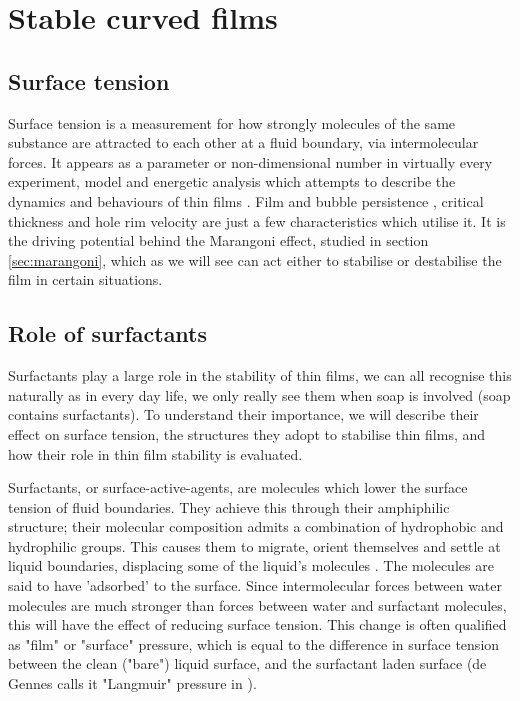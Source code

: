 \documentclass[a4paper,12pt]{article}
\numberwithin{equation}{section}
\numberwithin{figure}{section}
\numberwithin{table}{section}
\begin{document}
\newpage
\section{Stable curved films}
\subsection{Surface tension}
Surface tension is a measurement for how strongly molecules of the same substance are attracted to each other at a fluid boundary, via intermolecular forces. It appears as a parameter or non-dimensional number in virtually every experiment, model and energetic analysis which attempts to describe the dynamics and behaviours of thin films \cite{Ida1998}. Film and bubble persistence \cite{Modini2013}, critical thickness \cite{Manev1974, Lhuissier2011} and hole rim velocity \cite{Culick1960} are just a few characteristics which utilise it. It is the driving potential behind the Marangoni effect, studied in section \ref{sec:marangoni}, which as we will see can act either to stabilise or destabilise the film in certain situations.


\subsection{Role of surfactants}
Surfactants play a large role in the stability of thin films, we can all recognise this naturally as in every day life, we only really see them when soap is involved (soap contains surfactants). To understand their importance, we will describe their effect on surface tension, the structures they adopt to stabilise thin films, and how their role in thin film stability is evaluated.

Surfactants, or surface-active-agents, are molecules which lower the surface tension of fluid boundaries. They achieve this through their amphiphilic structure; their molecular composition admits a combination of hydrophobic and hydrophilic groups. This causes them to migrate, orient themselves and settle at liquid boundaries, displacing some of the liquid's molecules \cite{Gast1997}. The molecules are said to have 'adsorbed' to the surface. Since intermolecular forces between water molecules are much stronger than forces between water and surfactant molecules, this will have the effect of reducing surface tension. This change is often qualified as "film" or "surface" pressure, which is equal to the difference in surface tension between the clean ("bare") liquid surface, and the surfactant laden surface \cite{Bhamla2017} (de Gennes calls it "Langmuir" pressure in \cite{deGennesYoung2001}).  %
\end{document}
